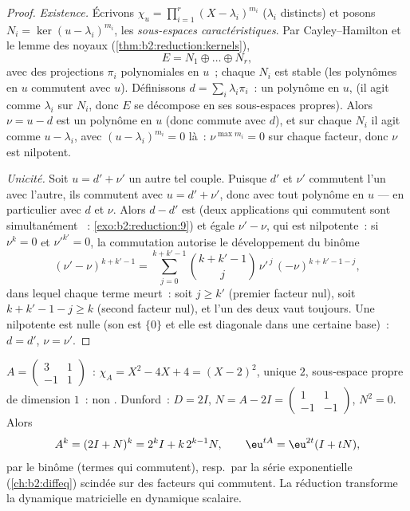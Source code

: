 \begin{proof}
\emph{Existence.} Écrivons $\chi_u = \prod_{i=1}^{r} (X -
\lambda_i)^{m_i}$ ($\lambda_i$ distincts) et posons $N_i = \ker(u -
\lambda_i)^{m_i}$, les \emph{sous-espaces caractéristiques}. Par
Cayley--Hamilton et le lemme des noyaux
(\cref{thm:b2:reduction:kernels}),
\[
E = N_1 \oplus \dots \oplus N_r ,
\]
avec des projections $\pi_i$ polynomiales en $u$~; chaque $N_i$ est
stable (les polynômes en $u$ commutent avec $u$). Définissons $d =
\sum_i \lambda_i \pi_i$~: un polynôme en $u$,  (il agit
comme $\lambda_i$ sur $N_i$, donc $E$ se décompose en ses sous-espaces
propres). Alors $\nu = u - d$ est un polynôme en $u$ (donc commute
avec $d$), et sur chaque $N_i$ il agit comme $u - \lambda_i$, avec $(u
- \lambda_i)^{m_i} = 0$ là~: $\nu^{\max m_i} = 0$ sur chaque facteur,
donc $\nu$ est nilpotent.

\emph{Unicité.} Soit $u = d' + \nu'$ un autre tel couple. Puisque $d'$
et $\nu'$ commutent l'un avec l'autre, ils commutent avec $u = d' +
\nu'$, donc avec tout polynôme en $u$ --- en particulier avec $d$ et
$\nu$. Alors $d - d'$ est  (deux applications
 qui commutent sont simultanément ~:
\cref{exo:b2:reduction:9}) et égale $\nu' - \nu$, qui est nilpotente~:
si $\nu^k = 0$ et $\nu'^{k'} = 0$, la commutation autorise le
développement du binôme
\[
(\nu' - \nu)^{k + k' - 1}
= \sum_{j=0}^{k+k'-1}\binom{k + k' - 1}{j}
\,\nu'^{\,j}\,(-\nu)^{k + k' - 1 - j} ,
\]
dans lequel chaque terme meurt~: soit $j \geq k'$ (premier facteur
nul), soit $k + k' - 1 - j \geq k$ (second facteur nul), et l'un des
deux vaut toujours. Une nilpotente  est nulle (son
 est $\{0\}$ et elle est diagonale dans une certaine base)~: $d
= d'$, $\nu = \nu'$.
\end{proof}

\begin{example}\label{ex:b2:reduction:powers}
$A = \begin{pmatrix} 3 & 1\\ -1 & 1\end{pmatrix}$~: $\chi_A = X^2 -
4X + 4 = (X-2)^2$,  unique $2$, sous-espace propre de
dimension $1$~: non . Dunford~: $D = 2I$, $N = A - 2I =
\begin{pmatrix} 1 & 1\\ -1 & -1\end{pmatrix}$, $N^2 = 0$. Alors
\[
A^k = (2I + N)^k = 2^k I + k\,2^{k-1} N ,
\qquad
\eu^{tA} = \eu^{2t}(I + tN),
\]
par le binôme (termes qui commutent), resp.\ par la série
exponentielle (\cref{ch:b2:diffeq}) scindée sur des facteurs qui
commutent. La réduction transforme la dynamique matricielle en
dynamique scalaire.
\end{example}

